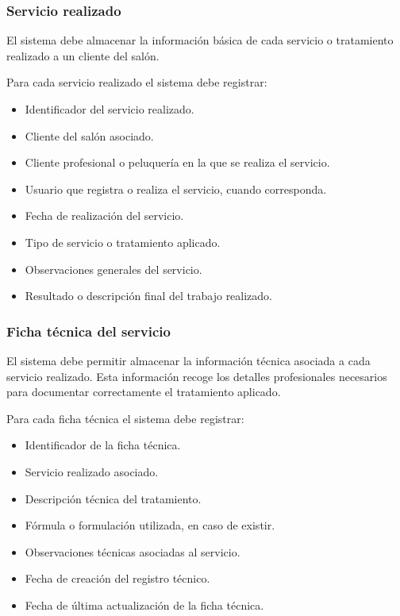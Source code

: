 \subsubsection*{Servicio realizado}

El sistema debe almacenar la información básica de cada servicio o tratamiento realizado a un cliente del salón.

Para cada servicio realizado el sistema debe registrar:

\begin{itemize}
    \item Identificador del servicio realizado.
    \item Cliente del salón asociado.
    \item Cliente profesional o peluquería en la que se realiza el servicio.
    \item Usuario que registra o realiza el servicio, cuando corresponda.
    \item Fecha de realización del servicio.
    \item Tipo de servicio o tratamiento aplicado.
    \item Observaciones generales del servicio.
    \item Resultado o descripción final del trabajo realizado.
\end{itemize}

\subsubsection*{Ficha técnica del servicio}

El sistema debe permitir almacenar la información técnica asociada a cada servicio realizado. Esta información recoge los detalles profesionales necesarios para documentar correctamente el tratamiento aplicado.

Para cada ficha técnica el sistema debe registrar:

\begin{itemize}
    \item Identificador de la ficha técnica.
    \item Servicio realizado asociado.
    \item Descripción técnica del tratamiento.
    \item Fórmula o formulación utilizada, en caso de existir.
    \item Observaciones técnicas asociadas al servicio.
    \item Fecha de creación del registro técnico.
    \item Fecha de última actualización de la ficha técnica.
\end{itemize}


